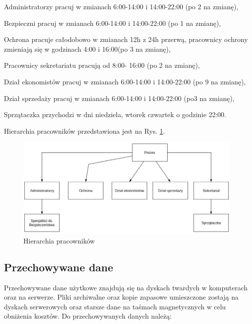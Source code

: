 \begin{minipage}[\right]{15cm}
	\begin{itemize*}
		\item Administratorzy pracuj w zmianach 6:00-14:00 i 14:00-22:00 (po 2 na zmianę),
		\item Bezpieczni pracuj w zmianach 6:00-14:00 i 14:00-22:00 (po 1 na zmianę),
		\item Ochrona pracuje całodobowo w zmianach 12h z 24h przerwą, pracownicy ochrony zmieniają się w godzinach 4:00 i 16:00(po 3 na zmianę),
		\item Pracownicy sekretariatu pracują od 8:00- 16:00 (po 2 na zmianę),
		\item Dział ekonomistów pracuj w zmianach 6:00-14:00 i 14:00-22:00 (po 9 na zmianę),
		\item Dział sprzedaży pracuj w zmianach 6:00-14:00 i 14:00-22:00 (po3 na zmianę),
		\item Sprzątaczka przychodzi w dni niedziela, wtorek czwartek o godzinie 22:00.
	\end{itemize*}
\end{minipage}

Hierarchia pracowników przedstawiona jest na Rys. \ref{schemat:hierarchia_pracownikow}.
\begin{figure}[!h]
	\includegraphics[width=15cm]{Hierarchia_pracownikow.png}
	\caption{Hierarchia pracowników}
	\label{schemat:hierarchia_pracownikow}
\end{figure}

\newpage
\subsection{Przechowywane dane}
Przechowywane dane użytkowe znajdują się na dyskach twardych \linebreak w komputerach oraz na serwerze. Pliki archiwalne oraz kopie zapasowe umieszczone zostają na dyskach serwerowych oraz starsze dane na taśmach magnetycznych w celu obniżenia kosztów. Do przechowywanych danych \linebreak należą:

